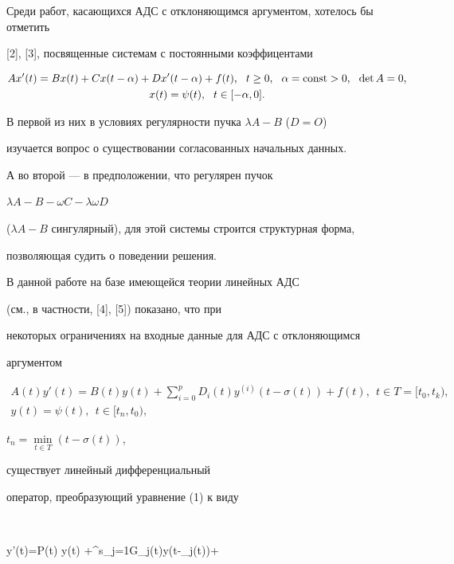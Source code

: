Среди работ, касающихся АДС с отклоняющимся аргументом, хотелось бы отметить


[2], [3], посвященные системам с  постоянными коэффицентами


\begin{gather*}


A x'(t)=B x(t)+C x(t-\alpha)+D x'(t-\alpha)+f(t),


\ \ t \geq 0,\ \ \alpha=\const>0,\ \ \det A=0, \\


x(t)=\psi(t),\ \ t\in[-\alpha,0].


\end{gather*}


В первой из них в условиях регулярности пучка $\lambda A-B$ ($D=O$)


изучается вопрос о существовании согласованных начальных данных.


А во второй --- в предположении, что регулярен пучок


$\lambda A-B- \omega C-\lambda\omega D$


($\lambda A-B$ сингулярный), для этой системы строится структурная форма,


позволяющая судить о поведении решения.





В данной работе на базе имеющейся теории линейных АДС


(см., в частности, [4], [5]) показано, что при


некоторых ограничениях на входные данные для АДС с отклоняющимся


аргументом


\begin{gather}


A(t)y'(t)=B(t)y(t)+\sum^p_{i=0}D_i(t)y^{(i)}(t-\sigma (t))+


f(t),\ \ t\in T=[t_0,t_k), \\


y(t)=\psi (t),\ \ t \in [t_n,t_0),


\end{gather}


$t_n=\min\limits_{t\in T}(t-\sigma(t))$,


существует линейный дифференциальный


оператор, преобразующий уравнение (1) к виду 


$$


y'(t)=P(t) y(t) +\sum^s_{j=1}G_j(t)y(t-\wt{\sigma}_j(t))+


